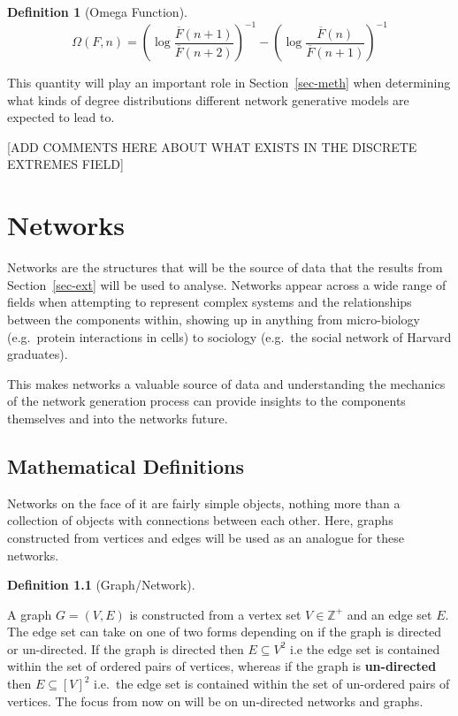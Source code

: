 \documentclass[
  10pt,
  a4paper,
]{scrreprt}
\theoremstyle{plain}
\theoremstyle{definition}
\newtheorem{definition}{Definition}[section]
\theoremstyle{remark}
\begin{document}
{\begin{definition}[Omega
Function]
\[
\Omega(F,n) = \left(\log\frac{\overline F (n+1)}{\overline F (n+2)}\right)^{-1} - \left(\log\frac{\overline F (n)}{\overline F (n+1)}\right)^{-1}
\]

\end{definition}

This quantity will play an important role in Section~\ref{sec-meth} when
determining what kinds of degree distributions different network
generative models are expected to lead to.

{[}ADD COMMENTS HERE ABOUT WHAT EXISTS IN THE DISCRETE EXTREMES FIELD{]}

\hypertarget{networks}{%
\chapter{Networks}\label{networks}}

Networks are the structures that will be the source of data that the
results from Section~\ref{sec-ext} will be used to analyse. Networks
appear across a wide range of fields when attempting to represent
complex systems and the relationships between the components within,
showing up in anything from micro-biology (e.g.~protein interactions in
cells) to sociology (e.g.~the social network of Harvard graduates).

This makes networks a valuable source of data and understanding the
mechanics of the network generation process can provide insights to the
components themselves and into the networks future.

\hypertarget{mathematical-definitions}{%
\section{Mathematical Definitions}\label{mathematical-definitions}}

Networks on the face of it are fairly simple objects, nothing more than
a collection of objects with connections between each other. Here,
graphs constructed from vertices and edges will be used as an analogue
for these networks.

\begin{definition}[Graph/Network]\protect\hypertarget{def-net}{}\label{def-net}

A graph \(G = (V,E)\) is constructed from a vertex set
\(V\in\mathbb Z^+\) and an edge set \(E\). The edge set can take on one
of two forms depending on if the graph is directed or un-directed. If
the graph is directed then \(E\subseteq V^2\) i.e the edge set is
contained within the set of ordered pairs of vertices, whereas if the
graph is \textbf{un-directed} then \(E\subseteq [V]^2\) i.e.~the edge
set is contained within the set of un-ordered pairs of vertices. The
focus from now on will be on un-directed networks and graphs.


\end{definition}}
\end{document}

